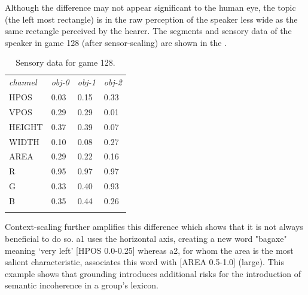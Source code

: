 Although the difference may not appear significant to 
the human eye, the topic (the left most rectangle) is 
in the raw perception of the speaker less wide as the same 
rectangle perceived by the hearer. 
The segments and sensory data of the speaker
in game 128 (after sensor-scaling) are shown in the 
. 
\begin{table}
\begin{center}
\begin{tabular}{ l  l  l  l }
\lsptoprule
{\itshape channel}& {\itshape obj-0} & {\itshape obj-1} & {\itshape obj-2}\\ 
HPOS & 0.03 & 0.15 & 0.33\\ 
VPOS & 0.29 & 0.29 & 0.01\\ 
HEIGHT & 0.37 & 0.39 & 0.07\\ 
WIDTH & 0.10 & 0.08 & 0.27\\ 
AREA & 0.29 & 0.22 & 0.16\\ 
R & 0.95 & 0.97 & 0.97 \\ 
G & 0.33 & 0.40 & 0.93\\ 
B & 0.35 & 0.44 & 0.26\\ 
\lspbottomrule
\end{tabular}
\caption{ \label{tab:game128} Sensory data for game 128.}
\end{center}
\end{table}
Context-scaling further
amplifies this difference which shows that it is not 
always beneficial to do so. {\bfshape a1} uses
the horizontal axis, creating a new word "bagaxe" 
meaning `very left' [HPOS 0.0-0.25] whereas {\bfshape a2}, for
whom the area is the most salient characteristic, 
associates this word with [AREA 0.5-1.0] (large). 
This example shows that grounding introduces 
additional risks for the introduction of semantic
incoherence in a group's lexicon. 

